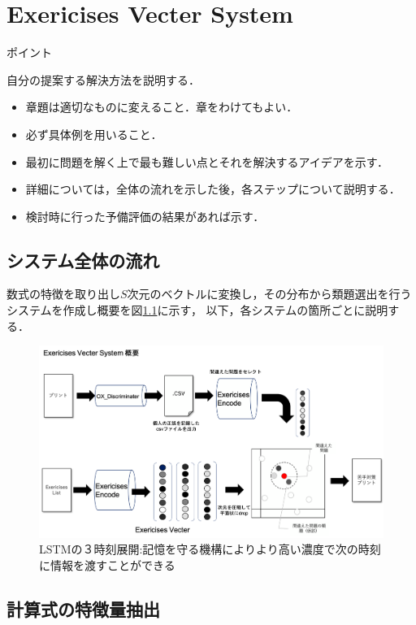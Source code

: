 \documentclass[a4j,11pt,report]{jsbook}
\newcommand{\point}[1]{
\begin{itembox}[l]{ポイント}
  #1
\end{itembox}
}
\begin{document}
\chapter{Exericises Vecter System\label{ch:method}}
\point{
自分の提案する解決方法を説明する．
\begin{itemize}
  \item 章題は適切なものに変えること．章をわけてもよい．
  \item 必ず具体例を用いること．
  \item 最初に問題を解く上で最も難しい点とそれを解決するアイデアを示す．
  \item 詳細については，全体の流れを示した後，各ステップについて説明する．
  \item 検討時に行った予備評価の結果があれば示す．
\end{itemize}
}
\fi

\section{システム全体の流れ}

数式の特徴を取り出し$S$次元のベクトルに変換し，その分布から類題選出を行うシステムを作成し概要を図\ref{fig:EVS_Simple}に示す，
以下，各システムの箇所ごとに説明する．


\begin{center}
  \begin{figure}[H]
    \centering
    \includegraphics[width=\linewidth]{image/EVS_Simpie.png}
    \caption{LSTMの３時刻展開:記憶を守る機構によりより高い濃度で次の時刻に情報を渡すことができる}
    \label{fig:EVS_Simple}
  \end{figure}
\end{center}

\section{計算式の特徴量抽出}
\end{document}
